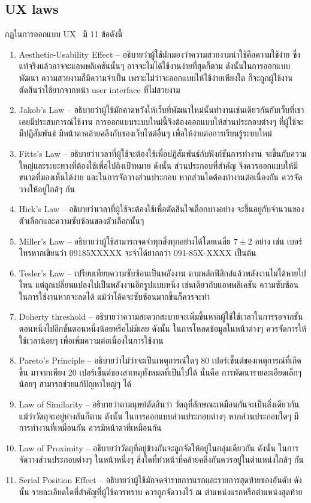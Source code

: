 \subsection{UX laws}
\label{subsec:uxlaws}
กฏในการออกแบบ UX~\cite{uxui} มี 11 ข้อดังนี้
\begin{enumerate}
  \item Aesthetic-Usability Effect -- อธิบายว่าผู้ใช้มักมองว่าความสวยงามน่าใช้คือความใช้ง่าย 
      ซึ่งแท้จริงแล้วอาจจะแอพพลิเคชันนั้นๆ อาจจะไม่ได้ใช้งานง่ายที่สุดก็ตาม ดังนั้นในการออกแบบพัฒนา ความสวยงามก็มีความจำเป็น
      เพราะไม่ว่าจะออกแบบให้ใช้ง่ายเพียงใด ก็จะถูกผู้ใช้งานตัดสินว่าใช้ยากจากหน้า user interface ที่ไม่สวยงาม
  \item Jakob's Law -- อธิบายว่าผู้ใช้มักคาดหวังให้เว็บที่พัฒนาใหม่นั้นทำงานเช่นเดียวกันกับเว็บที่เขาเคยมีประสบการณ์ใช้งาน
        การออกแบบระบบใหม่นี้จึงต้องออกแบบให้ส่วนประกอบต่างๆ ที่ผู้ใช้จะมีปฏิสัมพันธ์ มีหน้าตาคล้ายคลึงกับของเว็บไซต์อื่นๆ
        เพื่อให้ง่ายต่อการเรียนรู้ระบบใหม่
  \item Fitts's Law -- อธิบายว่าเวลาที่ผู้ใช้จะต้องใช้เพื่อปฏิสัมพันธ์กับฟังก์ชันการทำงาน จะขึ้นกับความใหญ่และระยะทางที่ต้องใช้เพื่อไปถึงเป้าหมาย
        ดังนั้น ส่วนประกอบที่สำคัญ จึงควรออกแบบให้มีขนาดที่มองเห็นได้ง่าย และในการจัดวางส่วนประกอบ หากส่วนใดต้องทำงานต่อเนื่องกัน ควรจัดวางให้อยู่ใกล้ๆ กัน
  \item Hick's Law -- อธิบายว่าเวลาที่ผู้ใช้จะต้องใช้เพื่อตัดสินใจเลือกบางอย่าง จะขึ้นอยู่กับจำนวนของตัวเลือกและความซับซ้อนของตัวเลือกนั้นๆ
  \item Miller's Law -- อธิบายว่าผู้ใช้สามารถจดจำทุกสิ่งทุกอย่างได้โดยเฉลี่ย $7\pm2$ อย่าง 
        เช่น เบอร์โทรหากเขียนว่า 09185XXXXX จะจำได้ยากกว่า 091-85X-XXXX เป็นต้น
  \item Tesler's Law -- เปรียบเทียบความซับซ้อนเป็นพลังงาน ตามหลักฟิสิกส์แล้วพลังงานไม่ได้หายไปไหน 
        แต่ถูกเปลี่ยนแปลงไปเป็นพลังงานอีกรูปแบบหนึ่ง เช่นเดียวกับแอพพลิเคชัน ความซับซ้อนในการใช้งานหากจะลดได้ 
        แม้ว่าโค้ดจะซับซ้อนมากขึ้นก็ควรจะทำ
  \item Doherty threshold -- อธิบายว่าความสะดวกสะบายจะเพิ่มขึ้นหากผู้ใช้ใช้เวลาในการรอจากขั้นตอนหนึ่งไปอีกขั้นตอนหนึ่งน้อยหรือไม่มีเลย 
        ดังนั้น ในการโหลดข้อมูลในหน้าต่างๆ ควรจัดการให้ใช้เวลาน้อยๆ เพื่อเพิ่มความต่อเนื่องในการใช้งาน
  \item Pareto's  Principle -- อธิบายว่าไม่ว่าจะเป็นเหตุการณ์ใดๆ 80 เปอร์เซ็นต์ของเหตุการณ์ที่เกิดขึ้น มาจากเพียง 20 เปอร์เซ็นต์ของสาเหตุทั้งหมดที่เป็นไปได้ 
        นั่นคือ การพัฒนารายละเอียดเล็กๆ น้อยๆ สามารถช่วยแก้ปัญหาใหญ่ๆ ได้
  \item Law of Similarity -- อธิบายว่าตามนุษย์ตัดสินว่า วัตถุที่ลักษณะเหมือนกันจะเป็นสิ่งเดียวกัน แม้ว่าวัตถุจะอยู่ห่างกันก็ตาม
        ดังนั้น ในการออกแบบส่วนประกอบต่างๆ หากส่วนประกอบใดๆ มีการทำงานที่เหมือนกัน ควรมีหน้าตาที่เหมือนกัน
  \item Law of Proximity -- อธิบายว่าวัตถุที่อยู่ข้างกันจะถูกจัดให้อยู่ในกลุ่มเดียวกัน 
        ดังนั้น ในการจัดวางส่วนประกอบต่างๆ ในหน้าหนึ่งๆ สิ่งใดที่ทำหน้าที่คล้ายคลึงกันควรอยู่ในตำแหน่งใกล้ๆ กัน
  \item Serial Position Effect -- อธิบายว่าผู้ใช้มักจดจำรายการแรกและรายการสุดท้ายของอันดับ
        ดังนั้น รายละเอียดใดที่สำคัญที่ผู้ใช้ควรทราบ ควรถูกจัดวางไว้ ณ ตำแหน่งแรกหรือตำแหน่งสุดท้าย
\end{enumerate}
